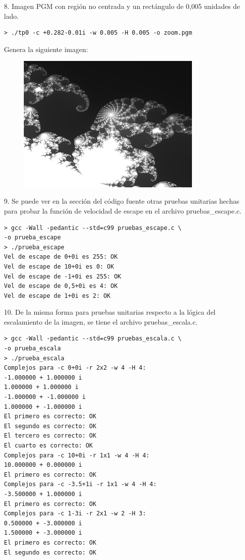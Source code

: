 \documentclass[a4paper,10pt]{article}
\begin{document}
8. Imagen PGM con regi\'on no centrada y un rect\'angulo de 0,005 unidades de lado.
\begin{verbatim}
> ./tp0 -c +0.282-0.01i -w 0.005 -H 0.005 -o zoom.pgm
\end{verbatim}
Genera la siguiente imagen:
\begin{figure}
\begin{center}
\includegraphics[width=0.8\textwidth]{./zoom.png}
\label{fig:Region comprendida entre 0,2795 - 0,0075i y 0,2845 - 0,0125i}
\caption{}
\end{center}
\end{figure}


9. Se puede ver en la sección del código fuente otras pruebas unitarias hechas para probar la función de velocidad de escape en el archivo pruebas\_escape.c.
\begin{verbatim}
> gcc -Wall -pedantic --std=c99 pruebas_escape.c \
-o prueba_escape
> ./prueba_escape
Vel de escape de 0+0i es 255: OK
Vel de escape de 10+0i es 0: OK
Vel de escape de -1+0i es 255: OK
Vel de escape de 0,5+0i es 4: OK
Vel de escape de 1+0i es 2: OK
\end{verbatim}

10. De la misma forma para pruebas unitarias respecto a la lógica del escalamiento de la imagen, se tiene el archivo pruebas\_escala.c.
\begin{verbatim}
> gcc -Wall -pedantic --std=c99 pruebas_escala.c \
-o prueba_escala
> ./prueba_escala
Complejos para -c 0+0i -r 2x2 -w 4 -H 4:
-1.000000 + 1.000000 i
1.000000 + 1.000000 i
-1.000000 + -1.000000 i
1.000000 + -1.000000 i
El primero es correcto: OK
El segundo es correcto: OK
El tercero es correcto: OK
El cuarto es correcto: OK
Complejos para -c 10+0i -r 1x1 -w 4 -H 4:
10.000000 + 0.000000 i
El primero es correcto: OK
Complejos para -c -3.5+1i -r 1x1 -w 4 -H 4:
-3.500000 + 1.000000 i
El primero es correcto: OK
Complejos para -c 1-3i -r 2x1 -w 2 -H 3:
0.500000 + -3.000000 i
1.500000 + -3.000000 i
El primero es correcto: OK
El segundo es correcto: OK
\end{verbatim}
\end{document}
